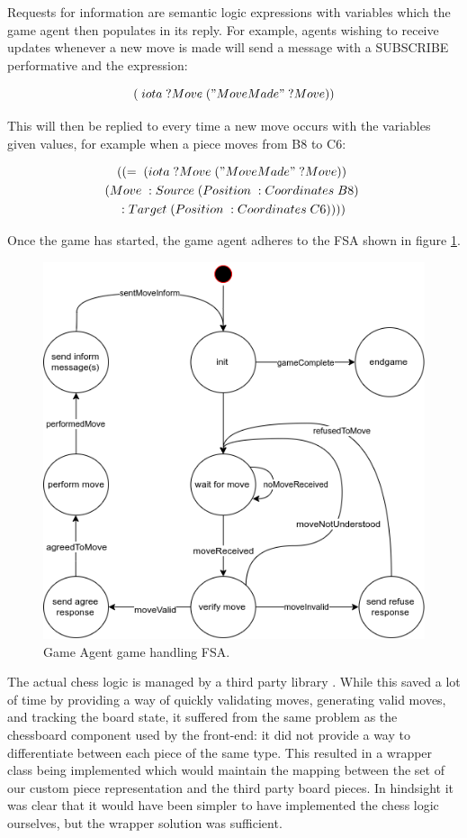 \documentclass{article}
\begin{document}
Requests for information are semantic logic expressions with variables which the game agent then populates in its reply. For example, agents wishing to receive updates whenever a new move is made will send a message with a SUBSCRIBE performative and the expression:

\begin{equation} \label{eq:movesubscribe}
	(\;iota\; ?Move\; ("Move Made"\; ?Move))	
\end{equation}

This will then be replied to every time a new move occurs with the variables given values, for example when a piece moves from B8 to C6:

\begin{multline} \label{eq:movesubscriberesponse}
	((=\; (iota\; ?Move\; ("Move Made"\; ?Move))\;  \\
	(Move\; :Source\; (Position\; :Coordinates\; B8)\; \\
	:Target\; (Position\; :Coordinates\; C6))))
\end{multline}

Once the game has started, the game agent adheres to the FSA shown in figure \ref{fig:gameagentfsa}. 

\begin{figure}[!ht]
	\centering
	\includegraphics[width=0.8\linewidth]{images/gameagentfsa}
	\caption{Game Agent game handling FSA.}
	\label{fig:gameagentfsa}
\end{figure}

The actual chess logic is managed by a third party library \cite{chesslib}. While this saved a lot of time by providing a way of quickly validating moves, generating valid moves, and tracking the board state, it suffered from the same problem as the chessboard component used by the front-end: it did not provide a way to differentiate between each piece of the same type. This resulted in a wrapper class being implemented which would maintain the mapping between the set of our custom piece representation and the third party board pieces. In hindsight it was clear that it would have been simpler to have implemented the chess logic ourselves, but the wrapper solution was sufficient.
\end{document}
